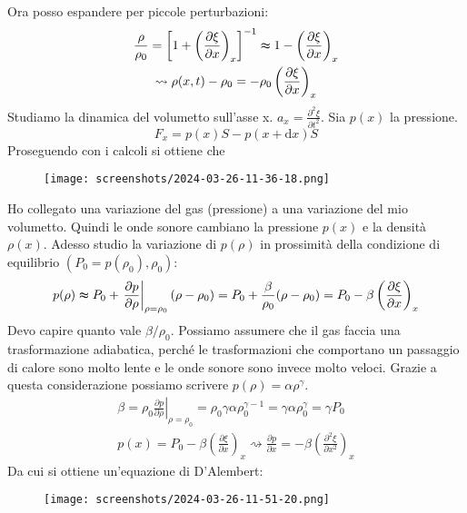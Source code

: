 Ora posso espandere per piccole perturbazioni:
\begin{gather}
	\frac{\rho }{\rho _0} = \left[1+ \left( \frac{\partial \xi }{\partial x}  \right)_x  \right] ^{-1} \thickapprox 1 - \left( \frac{\partial \xi }{\partial x}  \right)_x\\
	\rightsquigarrow \rho (x,t) - \rho _0 = - \rho _0 \left( \frac{\partial \xi }{\partial x}  \right)_x 
\end{gather}
Studiamo la dinamica del volumetto sull'asse x. \(a_x = \frac{\partial ^{2} \xi }{\partial t ^{2} } \). Sia \(p(x)\) la pressione.
\begin{equation}
	F_x = p(x)S - p(x+ \mathrm{d} x)S
\end{equation}
Proseguendo con i calcoli si ottiene che
\begin{figure}[H]
	\centering
	\texttt{[image: screenshots/2024-03-26-11-36-18.png]}
\end{figure}
Ho collegato una variazione del gas (pressione) a una variazione del mio volumetto. Quindi le onde sonore cambiano la pressione \(p(x)\) e la densità \(\rho (x)\). Adesso studio la variazione di \(p(\rho )\) in prossimità della condizione di equilibrio \((P_0=p(\rho _0), \rho _0)\):
\begin{equation}
	p(\rho )\thickapprox P_0 + \left. \frac{\partial p}{\partial \rho } \right| _{\rho = \rho _0}(\rho - \rho _0) = P_0 + \frac{\beta }{\rho _0}(\rho - \rho _0) = P_0 - \beta \left( \frac{\partial \xi }{\partial x}  \right) _x
\end{equation}
Devo capire quanto vale \(\beta / \rho _0\). Possiamo assumere che il gas faccia una trasformazione adiabatica, perché le trasformazioni che comportano un passaggio di calore sono molto lente e le onde sonore sono invece molto veloci. Grazie a questa considerazione possiamo scrivere \(p(\rho ) = \alpha \rho ^\gamma \).
\begin{gather}
	\beta = \rho _0 \left. \frac{\partial p}{\partial \rho } \right| _ {\rho = \rho _0} = \rho _0 \gamma \alpha \rho _0 ^{\gamma -1} = \gamma \alpha \rho _0 ^\gamma = \gamma P_0\\
	p(x) = P_0 - \beta \left( \frac{\partial \xi }{\partial x}  \right) _x \rightsquigarrow \frac{\partial p}{\partial x} = - \beta \left( \frac{\partial ^{2} \xi }{\partial x^{2} }  \right) _x
\end{gather}
Da cui si ottiene un'equazione di D'Alembert:
\begin{figure}[H]
	\centering
	\texttt{[image: screenshots/2024-03-26-11-51-20.png]}
\end{figure}
